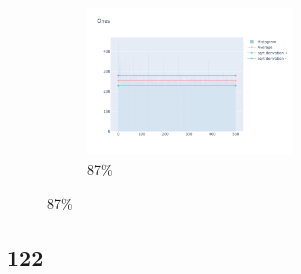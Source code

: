 \documentclass[12pt, fleqn]{report}                             %
\theoremstyle{break}                                            %
\begin{document}
\begin{figure}[ht!]
\begin{subfigure}[b]{0.4\linewidth}
          \includegraphics[width=0.6\textwidth]{Images/105/dia-d.png}
          \caption{87\%}
        \end{subfigure}
      \end{figure}


      \clearpage
      \subsection{122}
\end{document}
